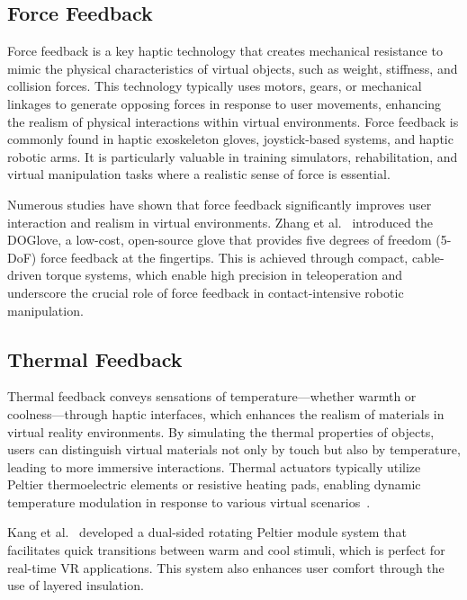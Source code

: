 \newpage
\subsection{Force Feedback}
Force feedback is a key haptic technology that creates mechanical resistance to mimic the physical characteristics of virtual objects, such as weight, stiffness, and collision forces. This technology typically uses motors, gears, or mechanical linkages to generate opposing forces in response to user movements, enhancing the realism of physical interactions within virtual environments. Force feedback is commonly found in haptic exoskeleton gloves, joystick-based systems, and haptic robotic arms. It is particularly valuable in training simulators, rehabilitation, and virtual manipulation tasks where a realistic sense of force is essential.~\cite{10.3389/fbioe.2020.541105}

Numerous studies have shown that force feedback significantly improves user interaction and realism in virtual environments. Zhang et al.~\cite{zhang2025doglovedexterousmanipulationlowcost} introduced the DOGlove, a low-cost, open-source glove that provides five degrees of freedom (5-DoF) force feedback at the fingertips. This is achieved through compact, cable-driven torque systems, which enable high precision in teleoperation and underscore the crucial role of force feedback in contact-intensive robotic manipulation.

\subsection{Thermal Feedback}
Thermal feedback conveys sensations of temperature—whether warmth or coolness—through haptic interfaces, which enhances the realism of materials in virtual reality environments. By simulating the thermal properties of objects, users can distinguish virtual materials not only by touch but also by temperature, leading to more immersive interactions. Thermal actuators typically utilize Peltier thermoelectric elements or resistive heating pads, enabling dynamic temperature modulation in response to various virtual scenarios~\cite{TANG2024100365}.

Kang et al.~\cite{10.48550/arXiv.2405.11807} developed a dual-sided rotating Peltier module system that facilitates quick transitions between warm and cool stimuli, which is perfect for real-time VR applications. This system also enhances user comfort through the use of layered insulation.

\newpage
